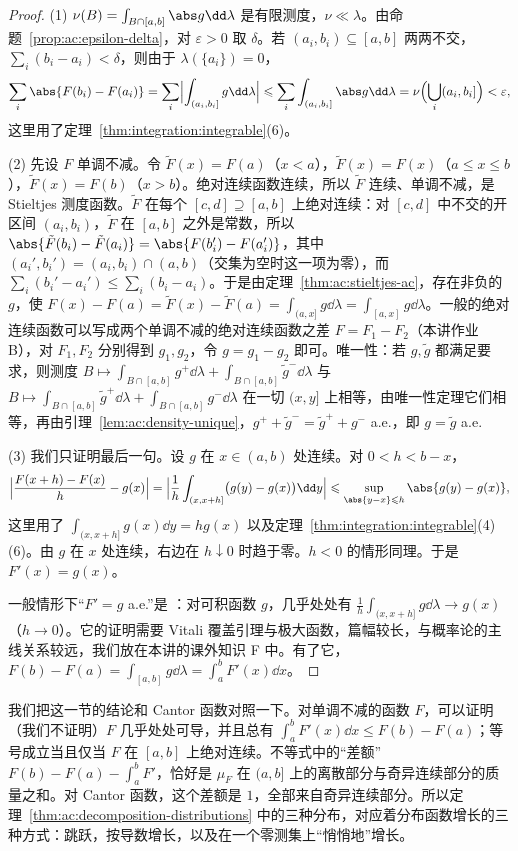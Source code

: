 \begin{proof}
(1) $\nu(B)=\int_{B\cap[a,b]}\abs g\dd\lambda$ 是有限测度，$\nu\ll\lambda$。由命题~\ref{prop:ac:epsilon-delta}，对 $\varepsilon>0$ 取 $\delta$。若 $(a_i,b_i)\subseteq[a,b]$ 两两不交，$\sum_i(b_i-a_i)<\delta$，则由于 $\lambda(\{a_i\})=0$，
\[
\sum_i\abs{F(b_i)-F(a_i)}=\sum_i\Bigl|\int_{(a_i,b_i]}g\dd\lambda\Bigr|\leqslant\sum_i\int_{(a_i,b_i]}\abs g\dd\lambda=\nu\Bigl(\bigcup_i(a_i,b_i]\Bigr)<\varepsilon,
\]
这里用了定理~\ref{thm:integration:integrable}(6)。

(2) 先设 $F$ 单调不减。令 $\tilde F(x)=F(a)$（$x<a$），$\tilde F(x)=F(x)$（$a\leqslant x\leqslant b$），$\tilde F(x)=F(b)$（$x>b$）。绝对连续函数连续，所以 $\tilde F$ 连续、单调不减，是 Stieltjes 测度函数。$\tilde F$ 在每个 $[c,d]\supseteq[a,b]$ 上绝对连续：对 $[c,d]$ 中不交的开区间 $(a_i,b_i)$，$\tilde F$ 在 $[a,b]$ 之外是常数，所以 $\abs{\tilde F(b_i)-\tilde F(a_i)}=\abs{F(b_i')-F(a_i')}$，其中 $(a_i',b_i')=(a_i,b_i)\cap(a,b)$（交集为空时这一项为零），而 $\sum_i(b_i'-a_i')\leqslant\sum_i(b_i-a_i)$。于是由定理~\ref{thm:ac:stieltjes-ac}，存在非负的 $g$，使 $F(x)-F(a)=\tilde F(x)-\tilde F(a)=\int_{(a,x]}g\dd\lambda=\int_{[a,x]}g\dd\lambda$。一般的绝对连续函数可以写成两个单调不减的绝对连续函数之差 $F=F_1-F_2$（本讲作业 B），对 $F_1,F_2$ 分别得到 $g_1,g_2$，令 $g=g_1-g_2$ 即可。唯一性：若 $g,\tilde g$ 都满足要求，则测度 $B\mapsto\int_{B\cap[a,b]}g^+\dd\lambda+\int_{B\cap[a,b]}\tilde g^-\dd\lambda$ 与 $B\mapsto\int_{B\cap[a,b]}\tilde g^+\dd\lambda+\int_{B\cap[a,b]}g^-\dd\lambda$ 在一切 $(x,y]$ 上相等，由唯一性定理它们相等，再由引理~\ref{lem:ac:density-unique}，$g^++\tilde g^-=\tilde g^++g^-$ a.e.，即 $g=\tilde g$ a.e.

(3) 我们只证明最后一句。设 $g$ 在 $x\in(a,b)$ 处连续。对 $0<h<b-x$，
\[
\Bigl|\frac{F(x+h)-F(x)}h-g(x)\Bigr|=\Bigl|\frac1h\int_{(x,x+h]}\bigl(g(y)-g(x)\bigr)\dd y\Bigr|\leqslant\sup_{\abs{y-x}\leqslant h}\abs{g(y)-g(x)},
\]
这里用了 $\int_{(x,x+h]}g(x)\dd y=hg(x)$ 以及定理~\ref{thm:integration:integrable}(4)(6)。由 $g$ 在 $x$ 处连续，右边在 $h\downarrow0$ 时趋于零。$h<0$ 的情形同理。于是 $F'(x)=g(x)$。

一般情形下“$F'=g$ a.e.”是 ：对可积函数 $g$，几乎处处有 $\frac1h\int_{(x,x+h]}g\dd\lambda\to g(x)$（$h\to0$）。它的证明需要 Vitali 覆盖引理与极大函数，篇幅较长，与概率论的主线关系较远，我们放在本讲的课外知识 F 中。有了它，$F(b)-F(a)=\int_{[a,b]}g\dd\lambda=\int_a^bF'(x)\dd x$。
\end{proof}

\begin{remark}
我们把这一节的结论和 Cantor 函数对照一下。对单调不减的函数 $F$，可以证明（我们不证明）$F$ 几乎处处可导，并且总有 $\int_a^bF'(x)\dd x\leqslant F(b)-F(a)$；等号成立当且仅当 $F$ 在 $[a,b]$ 上绝对连续。不等式中的“差额”$F(b)-F(a)-\int_a^bF'$，恰好是 $\mu_F$ 在 $(a,b]$ 上的离散部分与奇异连续部分的质量之和。对 Cantor 函数，这个差额是 $1$，全部来自奇异连续部分。所以定理~\ref{thm:ac:decomposition-distributions} 中的三种分布，对应着分布函数增长的三种方式：跳跃，按导数增长，以及在一个零测集上“悄悄地”增长。
\end{remark}

